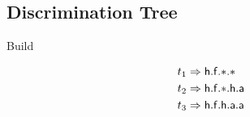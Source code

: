 \subsection{Discrimination Tree}

%
%
\begin{example}{Build}

	\def\TRIEWIDTH{4cm}
	\def\TEXTWIDTH{\textwidth-\TRIEWIDTH-2em}
	\begin{minipage}{\TEXTWIDTH}
%		
		
		\begin{align*}
		t_1 &\Rightarrow \mathsf{h}.\mathsf{f}.{*}.{*}\\
		t_2 &\Rightarrow \mathsf{h}.\mathsf{f}.{*}.\mathsf{h}.\mathsf{a} \\
		t_3 &\Rightarrow \mathsf{h}.\mathsf{f}.\mathsf{h}.\mathsf{a}.\mathsf{a}
		\end{align*}
	\end{minipage}
	\begin{minipage}{\TRIEWIDTH}
		\def\pyL{-0.3}
		\def\pxL{-0.0}
	\end{minipage}
\end{example}




